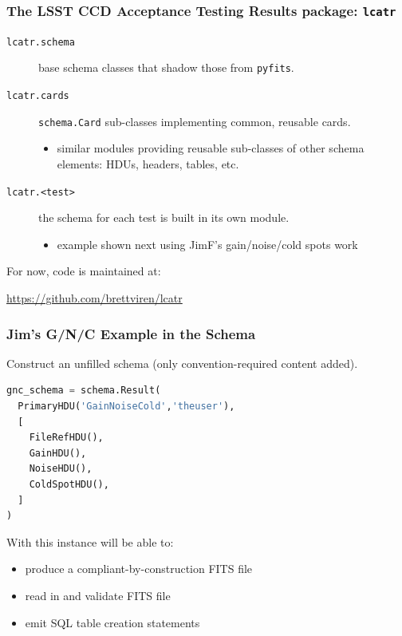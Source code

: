 \documentclass[bigger]{beamer}
\begin{document}
\begin{frame}
  \frametitle{The LSST CCD Acceptance Testing Results package: \texttt{lcatr}}
  \begin{description}
  \item[\texttt{lcatr.schema}] base schema classes that shadow those from \texttt{pyfits}.
  \item[\texttt{lcatr.cards}] \texttt{schema.Card} sub-classes
    implementing common, reusable cards.
    \begin{itemize}
    \item similar modules providing reusable sub-classes of other
      schema elements: HDUs, headers, tables, etc.
    \end{itemize}
  \item[\texttt{lcatr.<test>}] the schema for each test is built in its own module.
    \begin{itemize}
    \item example shown next using JimF's gain/noise/cold spots work
    \end{itemize}
  \end{description}
  For now, code is maintained at:
  \begin{center}
    \url{https://github.com/brettviren/lcatr}    
  \end{center}
\end{frame}

\begin{frame}[fragile]
  \frametitle{Jim's G/N/C Example in the Schema}

  Construct an unfilled schema (only convention-required content added).

  \begin{lstlisting}[language=Python]
gnc_schema = schema.Result(
  PrimaryHDU('GainNoiseCold','theuser'), 
  [
    FileRefHDU(),
    GainHDU(),
    NoiseHDU(),
    ColdSpotHDU(),
  ]
)
  \end{lstlisting}

  With this instance will be able to:
  \begin{itemize}
  \item produce a compliant-by-construction FITS file
  \item read in and validate FITS file
  \item emit SQL table creation statements
  \end{itemize}

\end{frame}
\end{document}
